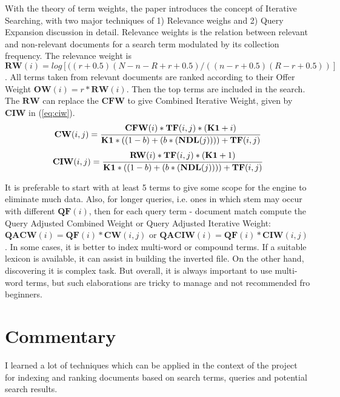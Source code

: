 \documentclass[a4paper, 11pt]{article}
\begin{document}
With the theory of term weights, the paper introduces the concept of Iterative Searching, with two major techniques of 1) Relevance weighs and 2) Query Expansion discussion in detail. Relevance weights is the relation between relevant and non-relevant documents for a search term modulated by its collection frequency. The relevance weight is \(\mathbf{RW}(i) = log [((r + 0.5)(N-n-R+r+0.5) / ((n-r+0.5)(R-r+0.5))]\). All terms taken from relevant documents are ranked according to their Offer Weight \(\mathbf{OW}(i) = r * \mathbf{RW}(i)\). Then the top terms are included in the search. The \(\mathbf{RW}\) can replace the \(\mathbf{CFW}\) to give Combined Iterative Weight, given by \(\mathbf{CIW}\) in (\ref{eq:ciw}).
\begin{equation}\label{eq:cfw}
\mathbf{CW (\mathnormal{i,j})} = \cfrac{\mathbf{CFW}(i) * \mathbf{TF} (i,j) * (\mathbf{K1} + i)}{\mathbf{K1} * ((1-b) + (b * (\mathbf{NDL} (j)) ) ) + \mathbf{TF}(i,j)}
\end{equation}
\begin{equation}\label{eq:ciw}
\mathbf{CIW (\mathnormal{i,j})} = \cfrac{\mathbf{RW}(i) * \mathbf{TF} (i,j) * (\mathbf{K1} + 1)}{\mathbf{K1} * ((1-b) + (b * (\mathbf{NDL} (j)) ) ) + \mathbf{TF}(i,j)}
\end{equation}

It is preferable to start with at least 5 terms to give some scope for the engine to eliminate much data. Also, for longer queries, i.e. ones in which stem may occur with different \(\mathbf{QF}(i)\), then for each query term - document match compute the Query Adjusted Combined Weight or Query Adjusted Iterative Weight: \(\mathbf{QACW}(i) = \mathbf{QF}(i) * \mathbf{CW}(i,j)\) or \(\mathbf{QACIW}(i) = \mathbf{QF}(i) * \mathbf{CIW}(i,j)\). In some cases, it is better to index multi-word or compound terms. If a suitable lexicon is available, it can assist in building the inverted file. On the other hand, discovering  it is complex task. But overall, it is always important to use multi-word terms, but such elaborations are tricky to manage and not recommended fro beginners.
\vspace{-10pt}
\section*{Commentary}
\vspace{-5pt}
I learned a lot of techniques which can be applied in the context of the project for indexing and ranking documents based on search terms, queries and potential search results.
\end{document}
